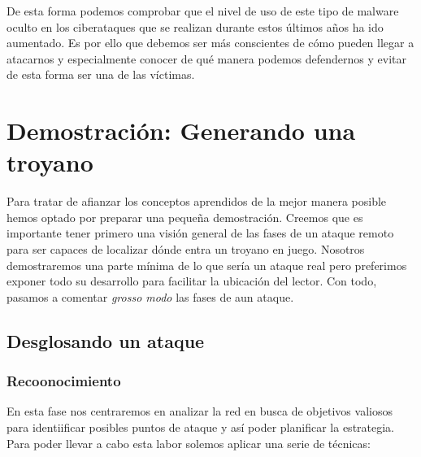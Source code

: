 \documentclass[12pt]{article}
\begin{document}
            De esta forma podemos comprobar que el nivel de uso de este tipo de malware oculto en los ciberataques que se realizan durante estos últimos años ha ido aumentado. Es por ello que debemos ser más conscientes de cómo pueden llegar a atacarnos y especialmente conocer de qué manera podemos defendernos y evitar de esta forma ser una de las víctimas.

    \section{Demostración: Generando una troyano}
        Para tratar de afianzar los conceptos aprendidos de la mejor manera posible hemos optado por preparar una pequeña demostración. Creemos que es importante tener primero una visión general de las fases de un ataque remoto para ser capaces de localizar dónde entra un troyano en juego. Nosotros demostraremos una parte mínima de lo que sería un ataque real pero preferimos exponer todo su desarrollo para facilitar la ubicación del lector. Con todo, pasamos a comentar \textit{grosso modo} las fases de aun ataque.

        \subsection{Desglosando un ataque}
            \subsubsection{Recoonocimiento}
                En esta fase nos centraremos en analizar la red en busca de objetivos valiosos para identiificar posibles puntos de ataque y así poder planificar la estrategia. Para poder llevar a cabo esta labor solemos aplicar una serie de técnicas:
\end{document}
